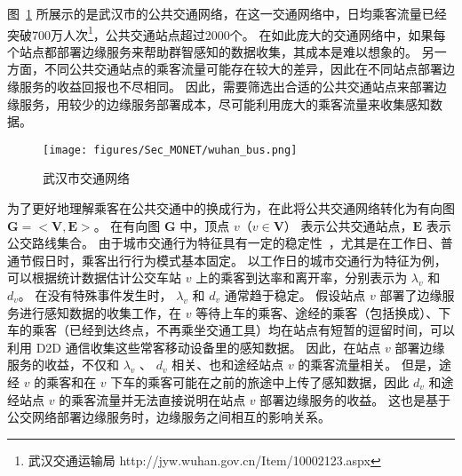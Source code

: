 

图~\ref{Figure_Wuhan_Buses} 所展示的是武汉市的公共交通网络，在这一交通网络中，日均乘客流量已经突破700万人次\footnote{武汉交通运输局 http://jyw.wuhan.gov.cn/Item/10002123.aspx}，公共交通站点超过2000个。
在如此庞大的交通网络中，如果每个站点都部署边缘服务来帮助群智感知的数据收集，其成本是难以想象的。
另一方面，不同公共交通站点的乘客流量可能存在较大的差异，因此在不同站点部署边缘服务的收益回报也不尽相同。
因此，需要筛选出合适的公共交通站点来部署边缘服务，用较少的边缘服务部署成本，尽可能利用庞大的乘客流量来收集感知数据。

\begin{figure}[!h]
  \centering
  \texttt{[image: figures/Sec\_MONET/wuhan\_bus.png]}
  \vspace{-0.5em}
  \caption{武汉市交通网络}
  \label{Figure_Wuhan_Buses}
\end{figure}

为了更好地理解乘客在公共交通中的换成行为，在此将公共交通网络转化为有向图 $\boldsymbol{G}=<\boldsymbol{V}, \boldsymbol{E}>$。
在有向图 $\boldsymbol{G}$ 中，顶点 $v$（$v \in \boldsymbol{V}$） 表示公共交通站点，$\boldsymbol{E}$ 表示公交路线集合。
由于城市交通行为特征具有一定的稳定性~\cite{TAO201490}，尤其是在工作日、普通节假日时，乘客出行行为模式基本固定。
以工作日的城市交通行为特征为例，可以根据统计数据估计公交车站 $v$ 上的乘客到达率和离开率，分别表示为 $\lambda_v$ 和 $d_v$。
在没有特殊事件发生时， $\lambda_v$ 和 $d_v$ 通常趋于稳定。
假设站点 $v$ 部署了边缘服务进行感知数据的收集工作，在 $v$ 等待上车的乘客、途经的乘客（包括换成）、下车的乘客（已经到达终点，不再乘坐交通工具）均在站点有短暂的逗留时间，可以利用 D2D 通信收集这些常客移动设备里的感知数据。
因此，在站点 $v$ 部署边缘服务的收益，不仅和 $\lambda_v$ 、 $d_v$ 相关、也和途经站点 $v$ 的乘客流量相关。
但是，途经 $v$ 的乘客和在 $v$ 下车的乘客可能在之前的旅途中上传了感知数据，因此 $d_v$ 和途经站点 $v$ 的乘客流量并无法直接说明在站点 $v$ 部署边缘服务的收益。
这也是基于公交网络部署边缘服务时，边缘服务之间相互的影响关系。

